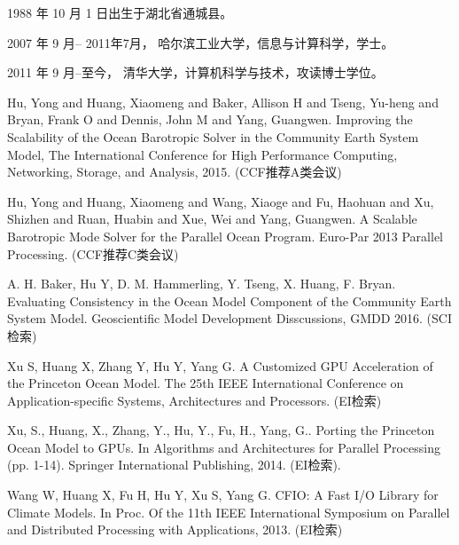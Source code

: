 \begin{resume}


  1988 年 10 月 1 日出生于湖北省通城县。

  2007 年 9 月-- 2011年7月， 哈尔滨工业大学，信息与计算科学，学士。

  2011 年 9 月--至今， 清华大学，计算机科学与技术，攻读博士学位。


  \begin{publications}
    \item Hu, Yong and Huang, Xiaomeng and Baker, Allison H and Tseng, Yu-heng and Bryan, Frank O and Dennis, John M and Yang, Guangwen. Improving the Scalability of the Ocean Barotropic Solver in the Community Earth System Model, The International Conference for High Performance Computing, Networking, Storage, and Analysis, 2015.  (CCF推荐A类会议)
    \item  Hu, Yong and Huang, Xiaomeng and Wang, Xiaoge and Fu, Haohuan and Xu, Shizhen and Ruan, Huabin and Xue, Wei and Yang, Guangwen. A Scalable Barotropic Mode Solver for the Parallel Ocean Program. Euro-Par 2013 Parallel Processing. (CCF推荐C类会议) 
  \end{publications}

  \begin{publications}[before=\publicationskip,after=\publicationskip]
    \item A. H. Baker, Hu Y, D. M. Hammerling, Y. Tseng, X. Huang, F. Bryan. Evaluating Consistency in the Ocean Model Component of the Community Earth System Model. Geoscientific Model Development Disscussions, GMDD 2016. (SCI检索)
  \end{publications}

  \begin{publications}
    \item Xu S, Huang X, Zhang Y, Hu Y, Yang G. A Customized GPU Acceleration of the Princeton Ocean Model. The 25th IEEE International Conference on Application-specific Systems, Architectures and Processors. (EI检索)
     \item  Xu, S., Huang, X., Zhang, Y., Hu, Y., Fu, H.,  Yang, G.. Porting the Princeton Ocean Model to GPUs. In Algorithms and Architectures for Parallel Processing (pp. 1-14). Springer International Publishing, 2014. (EI检索).
    \item Wang W, Huang X, Fu H, Hu Y, Xu S, Yang G. CFIO: A Fast I/O Library for Climate Models. In Proc. Of the 11th IEEE International Symposium on Parallel and Distributed Processing with Applications, 2013. (EI检索)
    

\end{publications}
\end{resume}
